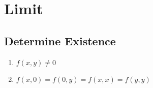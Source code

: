 \section{Limit}

  \subsection{Determine Existence}

    \begin{enumerate}
      \item $ f\left( x, y \right) \ne 0 $
      \item $ f\left( x, 0 \right) = f\left( 0, y \right) = f\left( x, x \right) = f\left( y, y \right)$
    \end{enumerate}